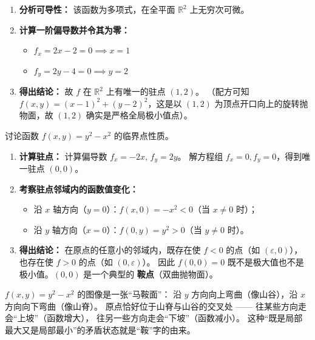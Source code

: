 \documentclass[lang=cn,11pt]{elegantbook}
\begin{document}
\begin{solution}
\begin{enumerate}
  \item \textbf{分析可导性：}
  该函数为多项式，在全平面 $\mathbb R^2$ 上无穷次可微。

  \item \textbf{计算一阶偏导数并令其为零：}
  \begin{itemize}
    \item $f_x=2x-2=0 \implies x=1$
    \item $f_y=2y-4=0 \implies y=2$
  \end{itemize}

  \item \textbf{得出结论：}
  故 $f$ 在 $\mathbb R^2$ 上有唯一的驻点 $(1,2)$。
  （配方可知 $f(x,y)=(x-1)^2+(y-2)^2$，这是以 $(1,2)$ 为顶点开口向上的旋转抛物面，故 $(1,2)$ 确实是严格全局极小值点）。
\end{enumerate}
\end{solution}

\begin{example}[鞍点的典型例子] \label{ex:saddle-point-basic}
讨论函数 $f(x,y)=y^2-x^2$ 的临界点性质。
\end{example}

\begin{solution}
\begin{enumerate}
  \item \textbf{计算驻点：}
  计算偏导数 $f_x=-2x$, $f_y=2y$。
  解方程组 $f_x=0, f_y=0$，得到唯一驻点 $(0,0)$。

  \item \textbf{考察驻点邻域内的函数值变化：}
  \begin{itemize}
    \item 沿 $x$ 轴方向（$y=0$）：$f(x,0)=-x^2<0$（当 $x \neq 0$ 时）；
    \item 沿 $y$ 轴方向（$x=0$）：$f(0,y)=y^2>0$（当 $y \neq 0$ 时）。
  \end{itemize}

  \item \textbf{得出结论：}
  在原点的任意小的邻域内，既存在使 $f<0$ 的点（如 $(\varepsilon,0)$），也存在使 $f>0$ 的点（如 $(0,\varepsilon)$）。
  因此 $f(0,0)=0$ 既不是极大值也不是极小值。$(0,0)$ 是一个典型的 \textbf{鞍点}（双曲抛物面）。
\end{enumerate}
\end{solution}

\begin{note}[鞍面的几何直观]
$f(x,y)=y^2-x^2$ 的图像是一张“马鞍面”：
沿 $y$ 方向向上弯曲（像山谷），沿 $x$ 方向向下弯曲（像山脊）。
原点恰好位于山脊与山谷的交叉处 ——
往某些方向走会“上坡”（函数增大），
往另一些方向走会“下坡”（函数减小）。
这种“既是局部最大又是局部最小”的矛盾状态就是“鞍”字的由来。
\end{note}
\end{document}

